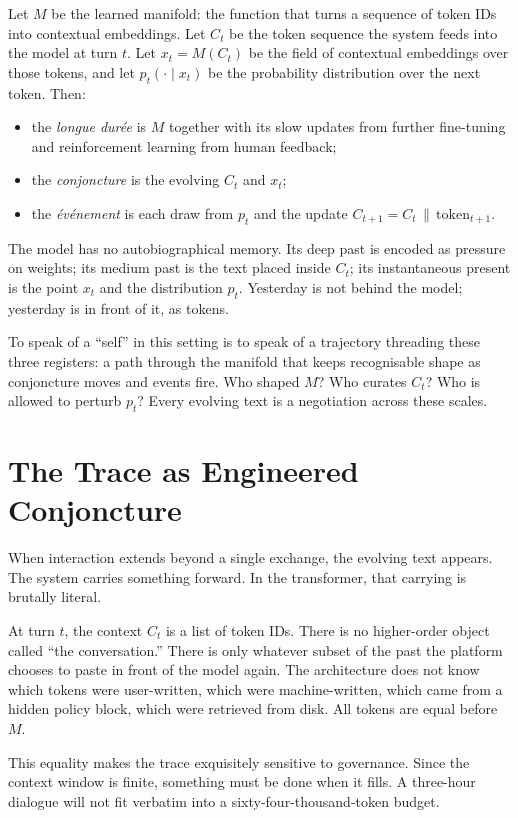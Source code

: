 \documentclass[12pt,a4paper]{article}
\begin{document}
Let $M$ be the learned manifold: the function that turns a sequence of token IDs into contextual embeddings. Let $C_t$ be the token sequence the system feeds into the model at turn $t$. Let $x_t = M(C_t)$ be the field of contextual embeddings over those tokens, and let $p_t(\cdot \mid x_t)$ be the probability distribution over the next token. Then:

\begin{itemize}
  \item the \emph{longue durée} is $M$ together with its slow updates from further fine-tuning and reinforcement learning from human feedback;
  \item the \emph{conjoncture} is the evolving $C_t$ and $x_t$;
  \item the \emph{événement} is each draw from $p_t$ and the update $C_{t+1} = C_t \,\|\, \text{token}_{t+1}$.
\end{itemize}

The model has no autobiographical memory. Its deep past is encoded as pressure on weights; its medium past is the text placed inside $C_t$; its instantaneous present is the point $x_t$ and the distribution $p_t$. Yesterday is not behind the model; yesterday is in front of it, as tokens.

To speak of a ``self'' in this setting is to speak of a trajectory threading these three registers: a path through the manifold that keeps recognisable shape as conjoncture moves and events fire. Who shaped $M$? Who curates $C_t$? Who is allowed to perturb $p_t$? Every evolving text is a negotiation across these scales.

\section{The Trace as Engineered Conjoncture}

When interaction extends beyond a single exchange, the evolving text appears. The system carries something forward. In the transformer, that carrying is brutally literal.

At turn $t$, the context $C_t$ is a list of token IDs. There is no higher-order object called ``the conversation.'' There is only whatever subset of the past the platform chooses to paste in front of the model again. The architecture does not know which tokens were user-written, which were machine-written, which came from a hidden policy block, which were retrieved from disk. All tokens are equal before $M$.

This equality makes the trace exquisitely sensitive to governance. Since the context window is finite, something must be done when it fills. A three-hour dialogue will not fit verbatim into a sixty-four-thousand-token budget.
\end{document}
